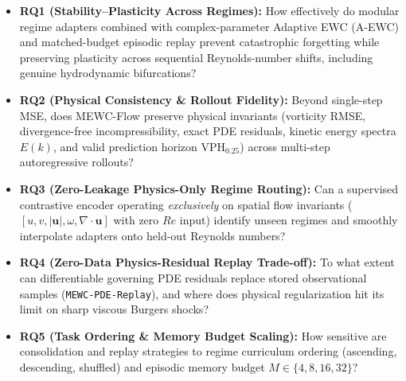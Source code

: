 \documentclass[11pt,a4paper]{article}
\begin{document}
\begin{itemize}
  \item \textbf{RQ1 (Stability--Plasticity Across Regimes):} How effectively do modular regime adapters combined with complex-parameter Adaptive EWC (A-EWC) and matched-budget episodic replay prevent catastrophic forgetting while preserving plasticity across sequential Reynolds-number shifts, including genuine hydrodynamic bifurcations?
  \item \textbf{RQ2 (Physical Consistency \& Rollout Fidelity):} Beyond single-step MSE, does MEWC-Flow preserve physical invariants (vorticity RMSE, divergence-free incompressibility, exact PDE residuals, kinetic energy spectra $E(k)$, and valid prediction horizon $\text{VPH}_{0.25}$) across multi-step autoregressive rollouts?
  \item \textbf{RQ3 (Zero-Leakage Physics-Only Regime Routing):} Can a supervised contrastive encoder operating \emph{exclusively} on spatial flow invariants ($[u, v, |\mathbf{u}|, \omega, \nabla\cdot\mathbf{u}]$ with zero $Re$ input) identify unseen regimes and smoothly interpolate adapters onto held-out Reynolds numbers?
  \item \textbf{RQ4 (Zero-Data Physics-Residual Replay Trade-off):} To what extent can differentiable governing PDE residuals replace stored observational samples (\texttt{MEWC-PDE-Replay}), and where does physical regularization hit its limit on sharp viscous Burgers shocks?
  \item \textbf{RQ5 (Task Ordering \& Memory Budget Scaling):} How sensitive are consolidation and replay strategies to regime curriculum ordering (ascending, descending, shuffled) and episodic memory budget $M \in \{4, 8, 16, 32\}$?
\end{itemize}
\end{document}
